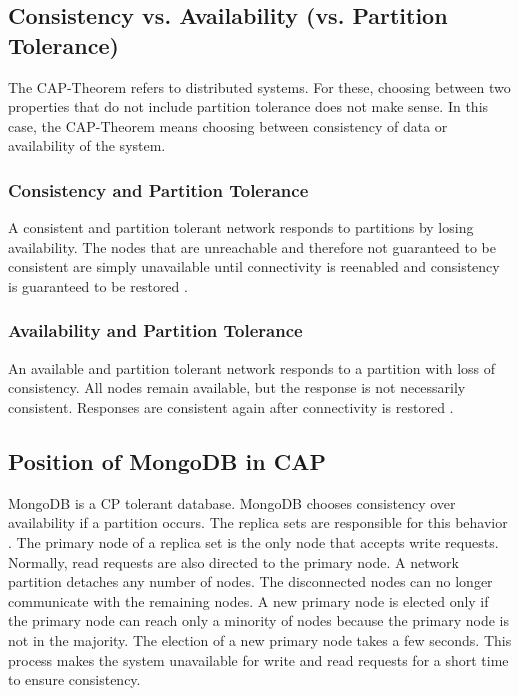 \subsection*{Consistency vs. Availability (vs. Partition Tolerance)}

The \ac{CAP}-Theorem refers to distributed systems. For these, choosing between two properties that do not include partition tolerance does not make sense. In this case, the \ac{CAP}-Theorem means choosing between consistency of data or availability of the system.

\subsubsection*{Consistency and Partition Tolerance}

A consistent and partition tolerant network responds to partitions by losing availability. The nodes that are unreachable and therefore not guaranteed to be consistent are simply unavailable until connectivity is reenabled and consistency is guaranteed to be restored \parencite[6]{brewer:2002}.

\subsubsection*{Availability and Partition Tolerance}

An available and partition tolerant network responds to a partition with loss of consistency. All nodes remain available, but the response is not necessarily consistent. Responses are consistent again after connectivity is restored \parencite[6]{brewer:2002}.

\subsection*{Position of MongoDB in CAP}

MongoDB is a \ac{CP} tolerant database. MongoDB chooses consistency over availability if a partition occurs. The replica sets are responsible for this behavior \parencite{stackoverflow:2023}.
The primary node of a replica set is the only node that accepts write requests. Normally, read requests are also directed to the primary node. A network partition detaches any number of nodes. The disconnected nodes can no longer communicate with the remaining nodes. A new primary node is elected only if the primary node can reach only a minority of nodes because the primary node is not in the majority. The election of a new primary node takes a few seconds. This process makes the system unavailable for write and read requests for a short time to ensure consistency.

